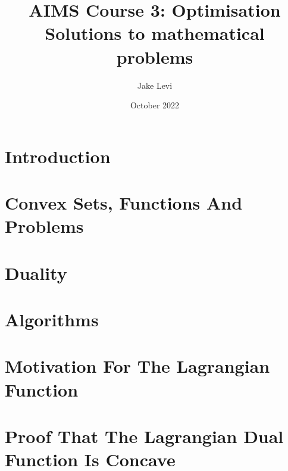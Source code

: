 \documentclass{article}
\title{
    AIMS Course 3: Optimisation \\
    \large Solutions to mathematical problems
}
\author{Jake Levi}
\date{October 2022}
\begin{document}
\maketitle
\section{Introduction} \label{section:intro}

\section{Convex Sets, Functions And Problems}

\section{Duality}

\section{Algorithms}



\appendix
\section{Motivation For The Lagrangian Function}\label{appendix:why lagrangian}

\section{Proof That The Lagrangian Dual Function Is Concave}\label{appendix:proof dual concave}

\end{document}
